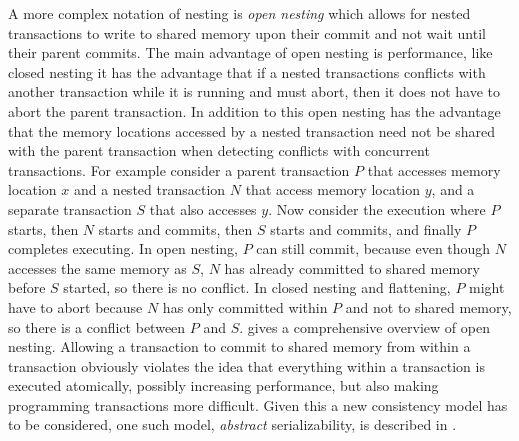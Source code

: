 A more complex notation of nesting is \emph{open nesting} which allows for nested 
transactions to write to shared memory upon their commit and not wait until their parent commits.
The main advantage of open nesting is performance, like closed nesting it has the 
advantage that if a nested transactions conflicts with another transaction while it 
is running and must abort, then it does not have to abort the parent transaction.
In addition to this open nesting has the advantage that the memory locations accessed
 by a nested transaction need not be shared with the parent transaction when detecting conflicts with concurrent transactions.
For example consider a parent transaction $P$ that accesses memory location $x$ and a 
nested transaction $N$ that access memory location $y$, and a separate transaction $S$ that also accesses $y$.
Now consider the execution where $P$ starts, then $N$ starts and commits, then $S$ starts 
and commits, and finally $P$ completes executing.
In open nesting, $P$ can still commit, because even though $N$ accesses the same memory
 as $S$, $N$ has already committed to shared memory before $S$ started, so there is no conflict. 
In closed nesting and flattening, $P$ might have to abort because $N$ has only committed
 within $P$ and not to shared memory, so there is a conflict between $P$ and $S$.
\cite{Mos06} gives a comprehensive overview of open nesting.
Allowing a transaction to commit to shared memory from within a transaction 
obviously violates the idea that everything within a transaction is executed atomically,
possibly increasing performance, but also making programming transactions more difficult.
Given this a new consistency model has to be considered, one such model, \emph{abstract} serializability,
is described  in \cite{NMA+07}.



